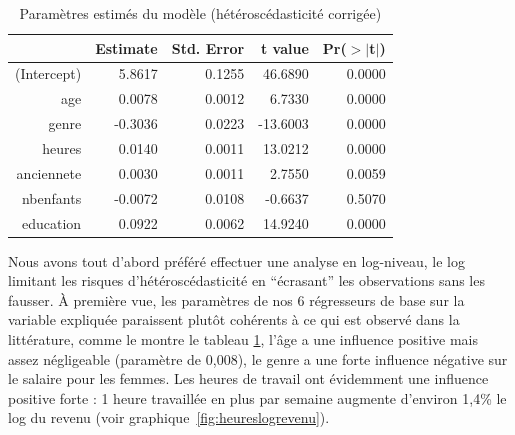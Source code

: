 \documentclass[a4paper, french, 11 pt]{article}\usepackage[]{graphicx}\usepackage[]{xcolor}
\makeatletter
\newenvironment{kframe}{%
 \def\at@end@of@kframe{}%
 \ifinner\ifhmode%
  \def\at@end@of@kframe{\end{minipage}}%
  \begin{minipage}{\columnwidth}%
 \fi\fi%
 \def\FrameCommand##1{\hskip\@totalleftmargin \hskip-\fboxsep
 \colorbox{shadecolor}{##1}\hskip-\fboxsep
     \hskip-\linewidth \hskip-\@totalleftmargin \hskip\columnwidth}%
 \MakeFramed {\advance\hsize-\width
   \@totalleftmargin\z@ \linewidth\hsize
   \@setminipage}}%
 {\par\unskip\endMakeFramed%
 \at@end@of@kframe}
\newenvironment{knitrout}{}{} %
\makeatother
\begin{document}
\begin{table}[ht]
\centering
\caption{Paramètres estimés du modèle (hétéroscédasticité corrigée)} 
\label{tb:lm1}
\begin{tabular}{rrrrr}
  \toprule
 & Estimate & Std. Error & t value & Pr($>$$|$t$|$) \\ 
  \midrule
(Intercept) & 5.8617 & 0.1255 & 46.6890 & 0.0000 \\ 
  age & 0.0078 & 0.0012 & 6.7330 & 0.0000 \\ 
  genre & -0.3036 & 0.0223 & -13.6003 & 0.0000 \\ 
  heures & 0.0140 & 0.0011 & 13.0212 & 0.0000 \\ 
  anciennete & 0.0030 & 0.0011 & 2.7550 & 0.0059 \\ 
  nbenfants & -0.0072 & 0.0108 & -0.6637 & 0.5070 \\ 
  education & 0.0922 & 0.0062 & 14.9240 & 0.0000 \\ 
   \bottomrule
\end{tabular}
\end{table}




Nous avons tout d’abord préféré effectuer une analyse en log-niveau, le log limitant les risques d’hétéroscédasticité en \enquote{écrasant} les observations sans les fausser. À première vue, les paramètres de nos 6 régresseurs de base sur la variable expliquée paraissent plutôt cohérents à ce qui est observé dans la littérature, comme le montre le tableau \ref{tb:lm1}, l’âge a une influence positive mais assez négligeable (paramètre de 0,008), le genre a une forte influence négative sur le salaire pour les femmes. Les heures de travail ont évidemment une influence positive forte : 1 heure travaillée en plus par semaine augmente d’environ 1,4\% le log du revenu (voir graphique~\ref{fig:heureslogrevenu}).

\begin{knitrout}
\color{fgcolor}\begin{kframe}


{\ttfamily\noindent\itshape{}}\end{kframe}
\end{knitrout}
\end{document}
